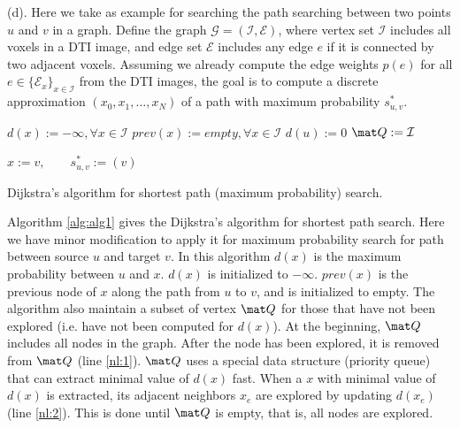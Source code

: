 \documentclass[12pt]{article}
\begin{document}
(d). Here we take \cite{zalesky2008dt} as example for searching the path
searching between two points $u$ and $v$ in a graph. Define the graph
$\mathcal{G} = (\mathcal{I}, \mathcal{E})$, where vertex set $\mathcal{I}$
includes all voxels in a DTI image, and edge set $\mathcal{E}$ includes any edge
$e$ if it is connected by two adjacent voxels. Assuming we already compute the
edge weights $p(e)$ for all $e\in \{\mathcal{E}_{x}\}_{x \in \mathcal{I}}$ from
the DTI images, the goal is to compute a discrete approximation $(x_0, x_1,
\dots, x_N)$ of a path with maximum probability $s^*_{u,v}$.
\begin{algorithm}[htb]
  \label{alg:alg1}
  \SetAlgoLined
  $d(x) := - \infty, \forall x \in \mathcal{I}$\;
  $prev(x) := empty, \forall x \in \mathcal{I}$\;
  $d(u) := 0$\;
  $\mat Q := \mathcal{I}$\;
  
  $x:=v, \qquad s^*_{u,v} := (v)$\; 
  \caption{Dijkstra's algorithm for shortest path (maximum probability) search. }
\end{algorithm}

Algorithm \ref{alg:alg1} gives the Dijkstra's algorithm for shortest path
search. Here we have minor modification to apply it for maximum probability
search for path between source $u$ and target $v$. In this algorithm $d(x)$ is
the maximum probability between $u$ and $x$. $d(x)$ is initialized to
$-\infty$. $prev(x)$ is the previous node of $x$ along the path from $u$ to $v$,
and is initialized to empty. The algorithm also maintain a subset of vertex
$\mat Q$ for those that have not been explored (i.e. have not been computed for
$d(x)$). At the beginning, $\mat Q$ includes all nodes in the graph. After the
node has been explored, it is removed from $\mat Q$ (line \ref{nl:1}). $\mat Q$
uses a special data structure (priority queue) that can extract minimal value of
$d(x)$ fast. When a $x$ with minimal value of $d(x)$ is extracted, its
adjacent neighbors $x_e$ are explored by updating $d(x_e)$ (line
\ref{nl:2}). This is done until $\mat Q$ is empty, that is, all nodes are
explored.
\end{document}
